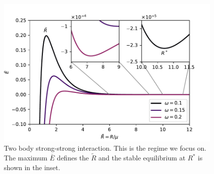 \begin{figure}[h]
\centering
\includegraphics[width=12cm]{elastic_figs/Epi2pi2_multiple_w.pdf}
\caption{Two body strong-strong interaction. This is the regime we focus on. The maximum $\bar{E}$ defines the $\tilde{R}$ and the stable equilibrium at $R^*$ is shown in the inset.}
\label{fig:ss}
\end{figure}
